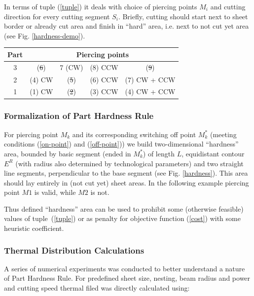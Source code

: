 \documentclass{../download/tPRS2e}
\begin{document}
In terms of tuple (\ref{tuple}) it deals with choice of piercing points $M_i$
and cutting direction for every cutting segment $S_i$.
Briefly, cutting should start next to sheet border or already cut area and finish in ``hard'' area,
i.e. next to not cut yet area (see Fig. \ref{hardness-demo}).

\begin{center}
\begin{tabular}{ c | c | c | c | c}
  \multicolumn{1}{c|}{Part} & \multicolumn{4}{c}{Piercing points} \\ \hline
  3 & (\st{6}) & 7 (CW) & (8) CCW & (\st{9}) \\
  2 & (4) CW & (\st{5}) & (6) CCW & (7) CW +  CCW \\
  1 & (1) CW & (\st{2}) & (3) CCW & (4) CW +  CCW \\
\end{tabular}
\end{center}

\subsubsection{Formalization of Part Hardness Rule}

For piercing point $M_k$ and its corresponding switching off point $M^*_k$
(meeting conditions (\ref{on-point}) and (\ref{off-point}))
we build two-dimensional ``hardness'' area,
bounded by basic segment (ended in  $M^*_k$) of length $L$,
equidistant contour $E^R$  (with radius also determined by technological parameters)
and two straight line segments, perpendicular to the base segment (see Fig. \ref{hardness}).
This area should lay entirely in (not cut yet) sheet areas.
In the following example piercing point $M1$ is valid, while $M2$ is not.

Thus defined ``hardness'' area can be used to prohibit some (otherwise feasible) values of tuple~(\ref{tuple})
or as penalty for objective function (\ref{cost}) with some heuristic coefficient.

\subsubsection{Thermal Distribution Calculations}

A series of numerical experiments was conducted to better understand a nature of Part Hardness Rule.
For predefined sheet size, nesting, beam radius and power and cutting speed thermal filed was directly calculated using:
\end{document}
